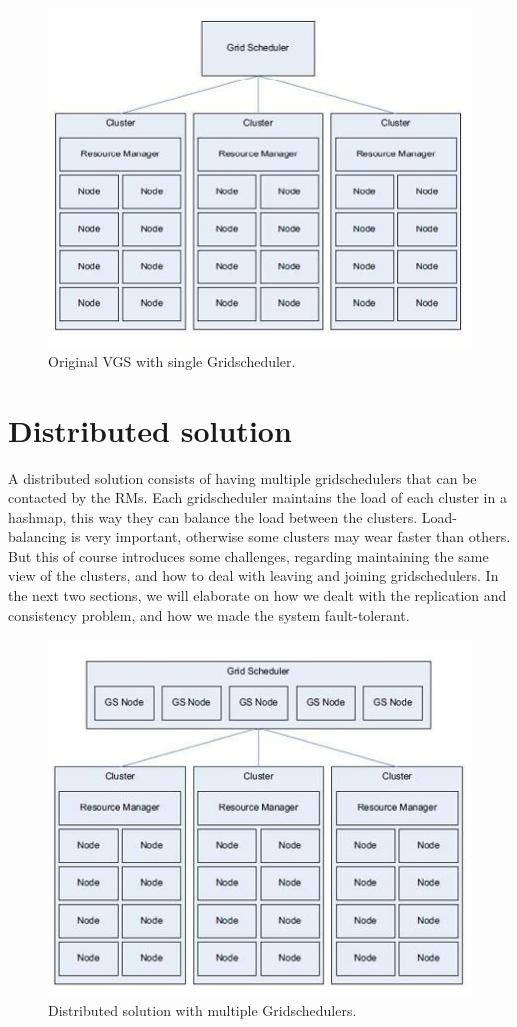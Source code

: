 \documentclass[twocolumn,a4paper]{article}
\begin{document}
\begin{figure}
	\includegraphics[scale=0.7]{singleGS.jpg}
	\caption{Original VGS with single Gridscheduler.}
\end{figure}

\section{Distributed solution}
A distributed solution consists of having multiple gridschedulers that can be contacted by the RMs. Each gridscheduler maintains the load of each cluster in a hashmap, this way they can balance the load between the clusters. Load-balancing is very important, otherwise some clusters may wear faster than others. But this of course introduces some challenges, regarding maintaining the same view of the clusters, and how to deal with leaving and joining gridschedulers. In the next two sections, we will elaborate on how we dealt with the replication and consistency problem, and how we made the system fault-tolerant.

\begin{figure}
	\includegraphics[scale=0.7]{distributedGS.jpg}
	\caption{Distributed solution with multiple Gridschedulers.}
\end{figure}
\end{document}
